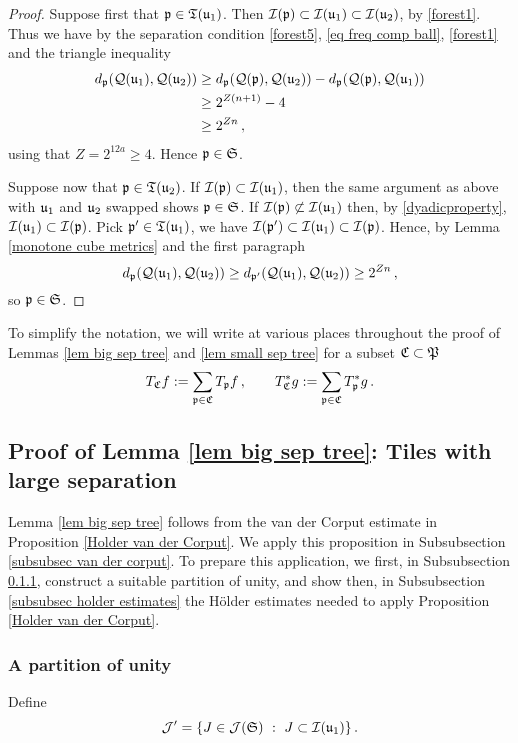 {\begin{proof}
    Suppose first that $\mathfrak p \in \mathfrak T(\mathfrak u_1)$. Then $\mathcal{I}(\mathfrak p) \subset \mathcal{I}(\mathfrak u_1) \subset \mathcal{I}(\mathfrak u_2)$, by \eqref{forest1}. Thus we have by the separation condition \eqref{forest5}, \eqref{eq freq comp ball}, \eqref{forest1} and the triangle inequality
    \begin{align*}
        d_{\mathfrak p}(\mathcal{Q}(\mathfrak u_1), \mathcal{Q}(\mathfrak u_2)) &\ge d_{\mathfrak p}(\mathcal{Q}(\mathfrak p), \mathcal{Q}(\mathfrak u_2)) - d_{\mathfrak p}(\mathcal{Q}(\mathfrak p), \mathcal{Q}(\mathfrak u_1))\\
        &\ge 2^{Z(n+1)} - 4\\
        &\ge 2^{Zn}\,,
    \end{align*}
    using that $Z= 2^{12a}\ge 4$. Hence $\mathfrak p \in \mathfrak{S}$.

    Suppose now that $\mathfrak p \in \mathfrak T(\mathfrak u_2)$. If $\mathcal{I}(\mathfrak p) \subset \mathcal{I}(\mathfrak u_1)$, then the same argument as above with $\mathfrak u_1$ and $\mathfrak u_2$ swapped shows $\mathfrak p \in \mathfrak{S}$. If $\mathcal{I}(\mathfrak p) \not \subset \mathcal{I}(\mathfrak u_1)$ then, by \eqref{dyadicproperty}, $\mathcal{I}(\mathfrak u_1) \subset \mathcal{I}(\mathfrak p)$. Pick $\mathfrak p' \in \mathfrak T(\mathfrak u_1)$, we have $\mathcal{I}(\mathfrak p') \subset \mathcal{I}(\mathfrak u_1) \subset \mathcal{I}(\mathfrak p)$. Hence, by Lemma \ref{monotone cube metrics} and the first paragraph
    $$
        d_{\mathfrak p}(\mathcal{Q}(\mathfrak u_1), \mathcal{Q}(\mathfrak u_2)) \ge d_{\mathfrak p'}(\mathcal{Q}(\mathfrak u_1), \mathcal{Q}(\mathfrak u_2)) \ge 2^{Zn}\,,
    $$
    so $\mathfrak p \in \mathfrak{S}$.
\end{proof}

To simplify the notation, we will write at various places throughout the proof of Lemmas \ref{lem big sep tree} and \ref{lem small sep tree} for a subset $\mathfrak C \subset \mathfrak P$
$$
    T_{\mathfrak C} f := \sum_{\mathfrak p \in \mathfrak C} T_{\mathfrak p} f\,, \quad\quad T_{\mathfrak C}^* g := \sum_{\mathfrak p\in\mathfrak C} T_{\mathfrak p}^* g\,.
$$

\subsection{Proof of Lemma \ref{lem big sep tree}: Tiles with large separation}
    \label{subsec big tiles}

Lemma \ref{lem big sep tree} follows from the van der Corput estimate in Proposition \ref{Holder van der Corput}. We apply this proposition in Subsubsection \ref{subsubsec van der corput}. To prepare this application, we first, in Subsubsection \ref{subsubsec pao}, construct a suitable partition of unity, and show then, in Subsubsection \ref{subsubsec holder estimates} the Hölder estimates needed to apply Proposition \ref{Holder van der Corput}.

\subsubsection{A partition of unity}
\label{subsubsec pao}
    Define
    $$
        \mathcal{J}' = \{J \in \mathcal{J}(\mathfrak{S}) \ : \ J \subset \mathcal{I}(\mathfrak u_1)\}\,.
    $$

}
